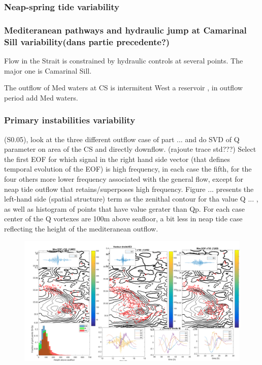 \subsubsection{Neap-spring tide variability}
\subsubsection{Mediteranean pathways and hydraulic jump at Camarinal Sill variability(dans partie precedente?)}

Flow in the Strait is constrained by hydraulic controls at several points. The major one is Camarinal Sill.

The outflow of Med waters at CS is intermitent
West a reservoir , in outflow period add Med waters.




\subsubsection{Primary instabilities variability}

(S0.05), look at the three different outflow case of part ... and do SVD of Q parameter on area of the CS and directly downflow. (rajoute trace std???) Select the first EOF for which signal in the right hand side vector (that defines temporal evolution of the EOF) is high frequency, in each case the fifth, for the four others more lower frequency associated with the general flow, except for neap tide outflow that retains/superposes high frequency. Figure ... presents the left-hand side (spatial structure) term as the zenithal contour for tha value Q ... , as well as histogram of points that have value gerater than Qp. For each case center of the Q vortexes are 100m above seafloor, a bit less in neap tide case reflecting the height of the mediteranean outflow.


\begin{figure}[!h]
 \includegraphics[width=\textwidth]{./GBR3D/EOF5_MIV_2D.png}
 \caption {}
\end{figure}

